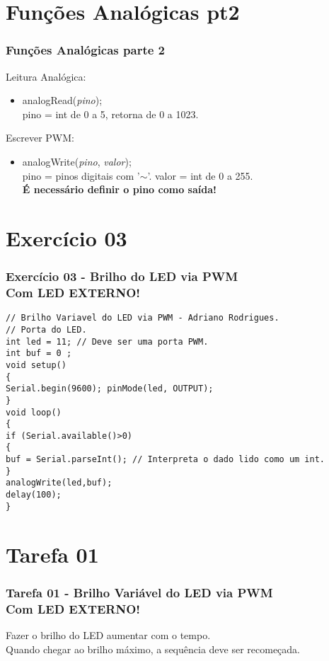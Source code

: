 \documentclass{beamer}
\begin{document}
\section{Funções Analógicas pt2}
\begin{frame}
	\frametitle{Funções Analógicas parte 2}
	Leitura Analógica:
	\begin{itemize}
		\item analogRead(\textit{pino});\\
		pino = int de 0 a 5, retorna de 0 a 1023.
	\end{itemize}
	Escrever PWM:
	\begin{itemize}
		\item analogWrite(\textit{pino}, \textit{valor});\\
		pino = pinos digitais com '$\sim$'.
		valor =  int de 0 a 255.\\
		\textbf{É necessário definir o pino como saída!}
	\end{itemize}
\end{frame}

\section{Exercício 03}
\begin{frame}[fragile]
	\frametitle{Exercício 03 - Brilho do LED via PWM \\ Com LED \textbf{EXTERNO}!}
	\begin{lstlisting}[style=Arduino,basicstyle=\scriptsize \ttfamily]
// Brilho Variavel do LED via PWM - Adriano Rodrigues.
// Porta do LED.
int led = 11; // Deve ser uma porta PWM.
int buf = 0 ;
void setup()
{
Serial.begin(9600); pinMode(led, OUTPUT);
}
void loop()
{
if (Serial.available()>0)
{
buf = Serial.parseInt(); // Interpreta o dado lido como um int.
}
analogWrite(led,buf);
delay(100);
}	\end{lstlisting}
\end{frame}

\section{Tarefa 01}
\begin{frame}
	\frametitle{Tarefa 01 - Brilho Variável do LED via PWM\\Com LED \textbf{EXTERNO}!}
	Fazer o brilho do LED aumentar com o tempo.\\[5pt]
	Quando chegar ao brilho máximo, a sequência deve ser recomeçada.
\end{frame}
\end{document}

